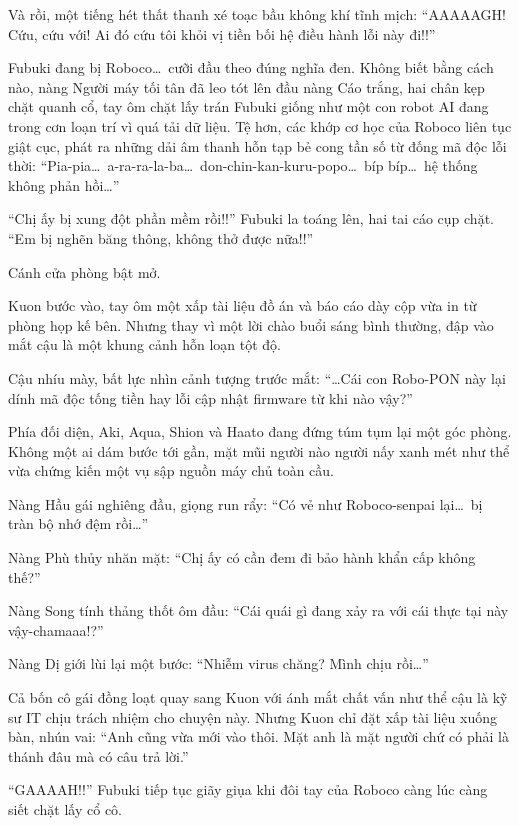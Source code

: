 \documentclass[../main.tex]{subfiles}
\begin{document}
Và rồi, một tiếng hét thất thanh xé toạc bầu không khí tĩnh mịch: ``AAAAAGH! Cứu, cứu với! Ai đó cứu tôi khỏi vị tiền bối hệ điều hành lỗi này đi!!''

Fubuki đang bị Roboco\dots\ cưỡi đầu theo đúng nghĩa đen. Không biết bằng cách nào, nàng Người máy tối tân đã leo tót lên đầu nàng Cáo trắng, hai chân kẹp chặt quanh cổ, tay ôm chặt lấy trán Fubuki giống như một con robot AI đang trong cơn loạn trí vì quá tải dữ liệu. Tệ hơn, các khớp cơ học của Roboco liên tục giật cục, phát ra những dải âm thanh hỗn tạp bẻ cong tần số từ đống mã độc lỗi thời: ``Pia-pia\dots\ a-ra-ra-la-ba\dots\ don-chin-kan-kuru-popo\dots\ bíp bíp\dots\ hệ thống không phản hồi\dots''


``Chị ấy bị xung đột phần mềm rồi!!'' Fubuki la toáng lên, hai tai cáo cụp chặt. ``Em bị nghẽn băng thông, không thở được nữa!!''

Cánh cửa phòng bật mở.

Kuon bước vào, tay ôm một xấp tài liệu đồ án và báo cáo dày cộp vừa in từ phòng họp kế bên. Nhưng thay vì một lời chào buổi sáng bình thường, đập vào mắt cậu là một khung cảnh hỗn loạn tột độ.

Cậu nhíu mày, bất lực nhìn cảnh tượng trước mắt: ``\dots Cái con Robo-PON này lại dính mã độc tống tiền hay lỗi cập nhật firmware từ khi nào vậy?''

Phía đối diện, Aki, Aqua, Shion và Haato đang đứng túm tụm lại một góc phòng. Không một ai dám bước tới gần, mặt mũi người nào người nấy xanh mét như thể vừa chứng kiến một vụ sập nguồn máy chủ toàn cầu.

Nàng Hầu gái nghiêng đầu, giọng run rẩy: ``Có vẻ như Roboco-senpai lại\dots\ bị tràn bộ nhớ đệm rồi\dots''

Nàng Phù thủy nhăn mặt: ``Chị ấy có cần đem đi bảo hành khẩn cấp không thế?''

Nàng Song tính thảng thốt ôm đầu: ``Cái quái gì đang xảy ra với cái thực tại này vậy-chamaaa!?''

Nàng Dị giới lùi lại một bước: ``Nhiễm virus chăng? Mình chịu rồi\dots''

Cả bốn cô gái đồng loạt quay sang Kuon với ánh mắt chất vấn như thể cậu là kỹ sư IT chịu trách nhiệm cho chuyện này. Nhưng Kuon chỉ đặt xấp tài liệu xuống bàn, nhún vai: ``Anh cũng vừa mới vào thôi. Mặt anh là mặt người chứ có phải là thánh đâu mà có câu trả lời.''

``GAAAAH!!'' Fubuki tiếp tục giãy giụa khi đôi tay của Roboco càng lúc càng siết chặt lấy cổ cô.
\end{document}
